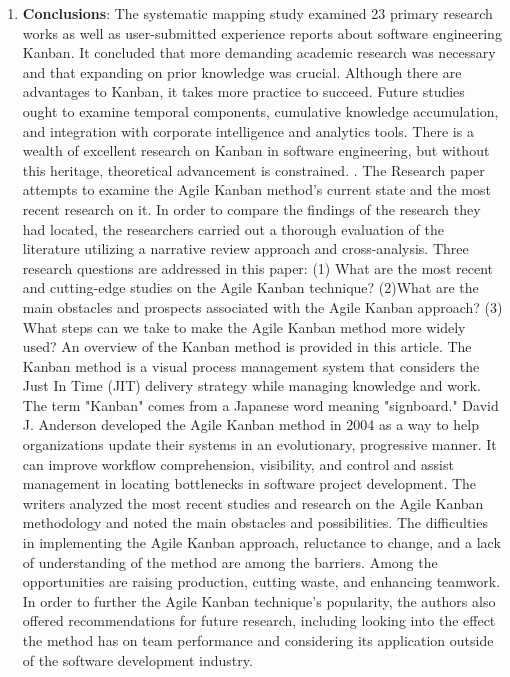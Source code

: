 \documentclass[conference]{IEEEtran}
\begin{document}
\begin{enumerate}
\item \textbf{Conclusions}: The systematic mapping study examined 23 primary research works as well as user-submitted experience reports about software engineering Kanban. It concluded that more demanding academic research was necessary and that expanding on prior knowledge was crucial. Although there are advantages to Kanban, it takes more practice to succeed. Future studies ought to examine temporal components, cumulative knowledge accumulation, and integration with corporate intelligence and analytics tools. There is a wealth of excellent research on Kanban in software engineering, but without this heritage, theoretical advancement is constrained.
\newline
{}. The Research paper \cite{kanban3}  attempts to examine the Agile Kanban method's current state and the most recent research on it. In order to compare the findings of the research they had located, the researchers carried out a thorough evaluation of the literature utilizing a narrative review approach and cross-analysis. Three research questions are addressed in this paper\cite{kanban3}:
\newline
(1) What are the most recent and cutting-edge studies on the Agile Kanban technique?
\newline
(2)What are the main obstacles and prospects associated with the Agile Kanban approach?
\newline
(3) What steps can we take to make the Agile Kanban method more widely used?
\newline
An overview of the Kanban method is provided in this article. The Kanban method is a visual process management system that considers the Just In Time (JIT) delivery strategy while managing knowledge and work. The term "Kanban" comes from a Japanese word meaning "signboard." David J. Anderson developed the Agile Kanban method in 2004 as a way to help organizations update their systems in an evolutionary, progressive manner. It can improve workflow comprehension, visibility, and control and assist management in locating bottlenecks in software project development.
\newline
The writers analyzed the most recent studies and research on the Agile Kanban methodology and noted the main obstacles and possibilities. The difficulties in implementing the Agile Kanban approach, reluctance to change, and a lack of understanding of the method are among the barriers. Among the opportunities are raising production, cutting waste, and enhancing teamwork. In order to further the Agile Kanban technique's popularity, the authors also offered recommendations for future research, including looking into the effect the method has on team performance and considering its application outside of the software development industry.

\end{enumerate}
\end{document}
